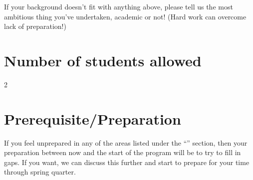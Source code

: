 \documentclass[12pt]{article}
\begin{document}
If your background doesn't fit with anything above,
please tell us the most ambitious thing you've undertaken,
academic or not!
(Hard work can overcome lack of preparation!)



\section{Number of students allowed}

2

\section{Prerequisite/Preparation}

If you feel unprepared in any of the areas listed under the
``'' section,
then your preparation between now and the start of the program will be to
try to fill in gaps.
If you want, we can discuss this further and start to prepare for your time through spring quarter.





\end{document}
